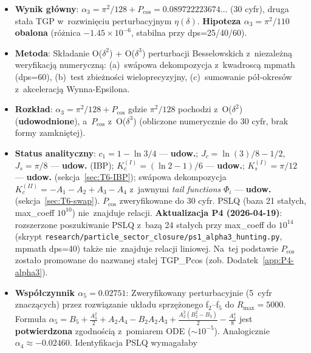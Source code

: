 \begin{itemize}
  \item \textbf{Wynik g\l{}\'owny}: $\alpha_3 = \pi^2/128 + P_{\cos} = 0.089722223674\ldots$
        (30 cyfr), druga sta\l{}a TGP w~rozwini\k{e}ciu perturbacyjnym $\eta(\delta)$.
        \textbf{Hipoteza $\alpha_3 = \pi^2/110$ obalona}
        (r\'o\.znica $-1.45 \times 10^{-6}$, stabilna przy dps=25/40/60).
  \item \textbf{Metoda}: Sk\l{}adanie O($\delta^2$) + O($\delta^3$) perturbacji Besselowskich
        z~niezale\.zn\k{a} weryfikacj\k{a} numeryczn\k{a}: (a)~sw\'apowa dekompozycja
        z~kwadrosc\k{a} mpmath (dps=60), (b)~test zbie\.zno\'sci wieloprecyzyjny,
        (c)~sumowanie p\'o\l{}-okres\'ow z~akceleracj\k{a} Wynna-Epsilona.
  \item \textbf{Rozk\l{}ad}: $\alpha_3 = \pi^2/128 + P_{\cos}$ gdzie
        $\pi^2/128$ pochodzi z~O($\delta^2$) (\textbf{udowodnione}), a~$P_{\cos}$
        z~O($\delta^3$) (obliczone numerycznie do 30 cyfr, brak formy zamkni\k{e}tej).
  \item \textbf{Status analityczny}: $c_1 = 1 - \ln 3/4$ --- \textbf{udow.};
        $J_c = \ln(3)/8 - 1/2$, $J_s = \pi/8$ --- \textbf{udow.} (IBP);
        $K_c^{(I)} = (\ln 2 - 1)/6$ --- \textbf{udow.};
        $K_s^{(I)} = \pi/12$ --- \textbf{udow.} (sekcja~\ref{sec:T6-IBP});
        sw\'apowa dekompozycja $K_c^{(II)} = -A_1 - A_2 + A_3 - A_4$ z~jawnymi
        \emph{tail functions} $\Phi_i$ --- \textbf{udow.}
        (sekcja~\ref{sec:T6-swap}). $P_{\cos}$ zweryfikowane do 30 cyfr.
        PSLQ (baza 21 sta\l{}ych, max\_coeff $10^{10}$) nie~znajduje relacji.
        \textbf{Aktualizacja P4 (2026-04-19)}: rozszerzone poszukiwanie PSLQ
        z~baz\k{a} 24 sta\l{}ych przy max\_coeff do $10^{14}$ (skrypt
        \texttt{research/particle\_sector\_closure/ps1\_alpha3\_hunting.py},
        mpmath dps=40) tak\.ze nie~znajduje relacji liniowej. Na~tej podstawie
        $P_{\cos}$ zosta\l{}o promowane do nazwanej sta\l{}ej TGP\_Pcos
        (zob. Dodatek~\ref{app:P4-alpha3}).
  \item \textbf{Wsp\'o\l{}czynnik $\alpha_5 = 0.02751$}: Zweryfikowany perturbacyjnie
        (5~cyfr znacz\k{a}cych) przez rozwi\k{a}zanie uk\l{}adu sprz\k{e}\.zonego
        f$_2$--f$_5$ do $R_{\max} = 5000$. Formu\l{}a $\alpha_5 = B_5 + \frac{A_3^2}{2}
        + A_2 A_4 - B_2 A_2 A_3 + \frac{A_2^2(B_2^2-B_3)}{2} - \frac{A_2^4}{8}$
        jest \textbf{potwierdzona} zgodno\'sci\k{a} z~pomiarem ODE ($\sim 10^{-5}$).
        Analogicznie $\alpha_4 \approx -0.02460$. Identyfikacja PSLQ wymaga\l{}aby

\end{itemize}
